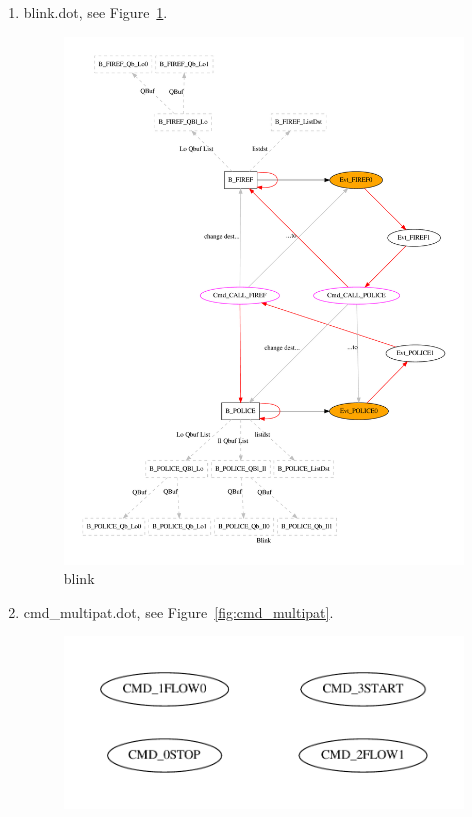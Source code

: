 \documentclass[12pt,a4paper]{report}
\begin{document}
\begin{enumerate}
\begin{verbatim}
./dm-cmd $1 $file starttime -t0 0000000
./dm-cmd $1 $file starttime -t1 0000000
./dm-cmd $1 $file start 0x3
sleep 1
./dm-cmd $1 $file heap
\end{verbatim}
\item blink.dot, see Figure~\ref{fig:blink}.
    \begin{figure}
        \centering 
        \includegraphics*[width=1.0\textwidth,keepaspectratio]{TestPattern/blink.pdf}
        \caption{blink}
        \label{fig:blink}
    \end{figure}
\item cmd\_multipat.dot, see Figure~\ref{fig:cmd_multipat}.
    \begin{figure}
        \centering 
        \includegraphics*[width=1.0\textwidth,keepaspectratio]{TestPattern/cmd_multipat.pdf}

\end{figure}
\end{enumerate}
\end{document}
